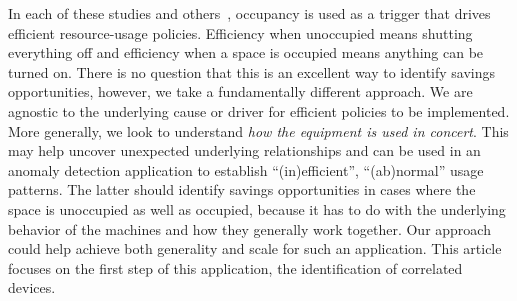In each of these studies and others~\cite{kaminthermo, buildanomaly}, occupancy is used as a trigger
that drives efficient resource-usage policies.  Efficiency
when unoccupied means shutting everything off and efficiency when a space is occupied means anything
can be turned on.  There is no question that this is an excellent way to identify savings opportunities, however, we
take a fundamentally different approach.  We are agnostic to the underlying cause or driver for efficient
policies to be implemented.  More generally, we look to understand \emph{how the equipment is used in
concert}.  This may help uncover unexpected underlying relationships and can be used in an anomaly detection application
to establish ``(in)efficient'', ``(ab)normal'' usage patterns.  The latter 
should identify savings opportunities in cases where the space is unoccupied as well 
as occupied, because it has to do with the underlying behavior of the machines and how they generally work
together.  Our approach could help achieve both generality and scale for such an application.
This article focuses on the first step of this application, the identification of correlated devices.



